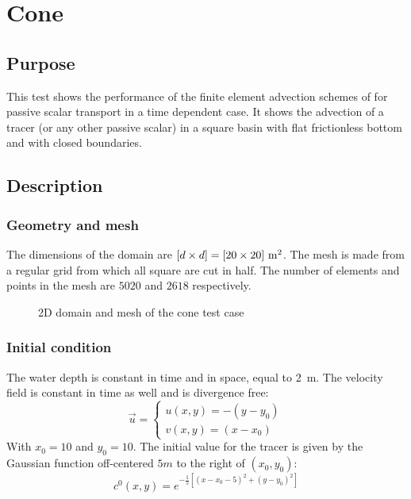 \chapter{Cone}
%


\section{Purpose}
This test shows the performance of the finite element advection schemes of  for passive scalar transport in a time dependent case.
It shows the advection of a tracer (or any other passive scalar) in a square basin with flat frictionless bottom and with closed boundaries.

\section{Description}

\subsection{Geometry and mesh}

The dimensions of the domain are $[d \times d]=[20 \times 20]~\rm{m}^2$.
The mesh is made from a regular grid from which all square are cut in half.
The number of elements and points in the mesh are $5020$ and $2618$ respectively.

\begin{figure}[h!]
\centering
{}
\caption{2D domain and mesh of the cone test case}
\label{t2d:cone:mesh}
\end{figure}

\subsection{Initial condition}

The water depth is constant in time and in space, equal to 2~m. The velocity field is constant in time as well and is divergence free:
\begin{equation*}
  \vec{u}=\left\{
         \begin{array}{l}
          u(x,y)=-(y-y_0) \\
          v(x,y)=(x-x_0)
         \end{array}\right.
\end{equation*}
With $x_0=10$ and $y_0=10$. The initial value for the tracer is given by the Gaussian function
off-centered $5m$ to the right of $(x_0, y_0)$:
\begin{equation*}
c^0(x,y)=e^{-\frac{1}{5}[(x-x_0-5)^2+(y-y_0)^2]}
\end{equation*}

